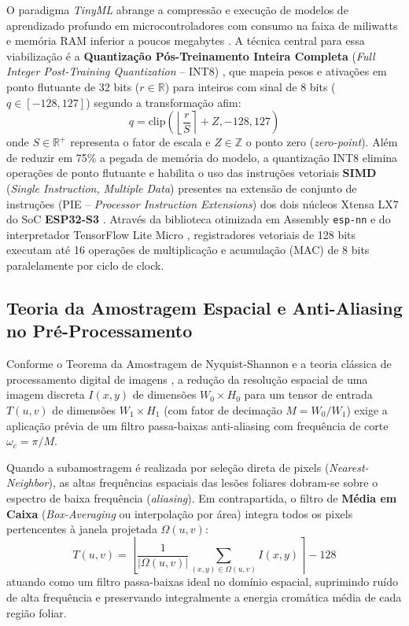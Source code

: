 \documentclass[12pt]{article}
\begin{document}
O paradigma \textit{TinyML} abrange a compressão e execução de modelos de aprendizado profundo em microcontroladores com consumo na faixa de miliwatts e memória RAM inferior a poucos megabytes \parencite{warden2019,moons2020}. A técnica central para essa viabilização é a \textbf{Quantização Pós-Treinamento Inteira Completa} (\textit{Full Integer Post-Training Quantization} -- INT8) \parencite{jacob2018}, que mapeia pesos e ativações em ponto flutuante de 32 bits ($r \in \mathbb{R}$) para inteiros com sinal de 8 bits ($q \in [-128, 127]$) segundo a transformação afim:
\begin{equation}
q = \text{clip}\left( \left\lfloor \frac{r}{S} \right\rceil + Z, -128, 127 \right)
\label{eq:quantizacao}
\end{equation}
onde $S \in \mathbb{R}^+$ representa o fator de escala e $Z \in \mathbb{Z}$ o ponto zero (\textit{zero-point}). Além de reduzir em 75\% a pegada de memória do modelo, a quantização INT8 elimina operações de ponto flutuante e habilita o uso das instruções vetoriais \textbf{SIMD} (\textit{Single Instruction, Multiple Data}) presentes na extensão de conjunto de instruções (PIE -- \textit{Processor Instruction Extensions}) dos dois núcleos Xtensa LX7 do SoC \textbf{ESP32-S3} \parencite{esp32s3,espressif2023esp32s3}. Através da biblioteca otimizada em Assembly \texttt{esp-nn} \parencite{espressif2023espnn} e do interpretador TensorFlow Lite Micro \parencite{tensorflow2024}, registradores vetoriais de 128 bits executam até 16 operações de multiplicação e acumulação (MAC) de 8 bits paralelamente por ciclo de clock.

\subsection{Teoria da Amostragem Espacial e Anti-Aliasing no Pré-Processamento}

Conforme o Teorema da Amostragem de Nyquist-Shannon \parencite{nyquist1928certain,shannon1949communication} e a teoria clássica de processamento digital de imagens \parencite{gonzalez2018digital}, a redução da resolução espacial de uma imagem discreta $I(x,y)$ de dimensões $W_0 \times H_0$ para um tensor de entrada $T(u,v)$ de dimensões $W_1 \times H_1$ (com fator de decimação $M = W_0 / W_1$) exige a aplicação prévia de um filtro passa-baixas anti-aliasing com frequência de corte $\omega_c = \pi / M$.

Quando a subamostragem é realizada por seleção direta de pixels (\textit{Nearest-Neighbor}), as altas frequências espaciais das lesões foliares dobram-se sobre o espectro de baixa frequência (\textit{aliasing}). Em contrapartida, o filtro de \textbf{Média em Caixa} (\textit{Box-Averaging} ou interpolação por área) integra todos os pixels pertencentes à janela projetada $\Omega(u,v)$:
\begin{equation}
T(u,v) = \left\lfloor \frac{1}{|\Omega(u,v)|} \sum_{(x,y) \in \Omega(u,v)} I(x,y) \right\rceil - 128
\label{eq:box_avg}
\end{equation}
atuando como um filtro passa-baixas ideal no domínio espacial, suprimindo ruído de alta frequência e preservando integralmente a energia cromática média de cada região foliar.
\end{document}
